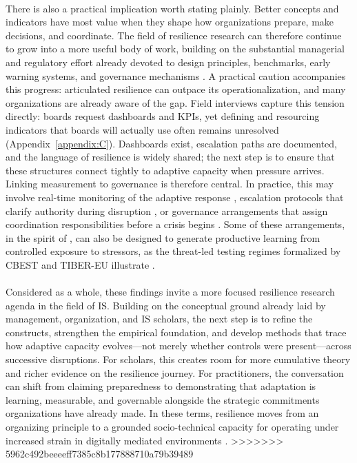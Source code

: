 \\
There is also a practical implication worth stating plainly. Better concepts and indicators have most value when they shape how organizations prepare, make decisions, and coordinate. The field of resilience research can therefore continue to grow into a more useful body of work, building on the substantial managerial and regulatory effort already devoted to design principles, benchmarks, early warning systems, and governance mechanisms \autocite{calder2021iso,bcbs2021operational,nist2024csf}. A practical caution accompanies this progress: articulated resilience can outpace its operationalization, and many organizations are already aware of the gap. Field interviews \autocite{rota2024} capture this tension directly: boards request dashboards and KPIs, yet defining and resourcing indicators that boards will actually use often remains unresolved (Appendix~\ref{appendix:C}). Dashboards exist, escalation paths are documented, and the language of resilience is widely shared; the next step is to ensure that these structures connect tightly to adaptive capacity when pressure arrives. Linking measurement to governance is therefore central. In practice, this may involve real-time monitoring of the adaptive response \autocite{kuypers2018designing,gillard2023efficient}, escalation protocols that clarify authority during disruption \autocite{westrum2004typology,boin2013resilient}, or governance arrangements that assign coordination responsibilities before a crisis begins \autocite{ostrom1990governing,arnold2004informationsharing}. Some of these arrangements, in the spirit of \textcite{taleb2012antifragile}, can also be designed to generate productive learning from controlled exposure to stressors, as the threat-led testing regimes formalized by CBEST and TIBER-EU illustrate \autocite{ecb2018tiber}.\\
\\
Considered as a whole, these findings invite a more focused resilience research agenda in the field of IS. Building on the conceptual ground already laid by management, organization, and IS scholars, the next step is to refine the constructs, strengthen the empirical foundation, and develop methods that trace how adaptive capacity evolves---not merely whether controls were present---across successive disruptions. For scholars, this creates room for more cumulative theory and richer evidence on the resilience journey. For practitioners, the conversation can shift from claiming preparedness to demonstrating that adaptation is learning, measurable, and governable alongside the strategic commitments organizations have already made. In these terms, resilience moves from an organizing principle to a grounded socio-technical capacity for operating under increased strain in digitally mediated environments \autocite{majchrzak2016designing}.
>>>>>>> 5962c492beeeeff7385c8b177888710a79b39489
